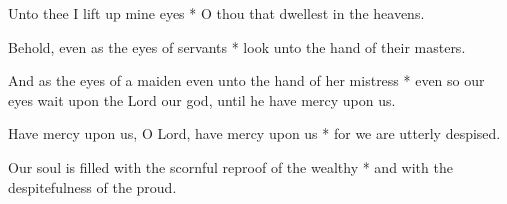 \begin{multicols}{2}
	
	Unto thee I lift up mine eyes * O thou that dwellest in the heavens.
	
	Behold, even as the eyes of servants * look unto the hand of their masters.
	
	And as the eyes of a maiden even  unto the hand of her mistress * even so our eyes wait upon the Lord our god, until he have mercy upon us.
	
	Have mercy upon us, O Lord, have mercy upon us * for we are utterly despised.
	
	Our soul is filled with the scornful reproof of the wealthy * and with the despitefulness of the proud.
	
	\gloria{}
\end{multicols}